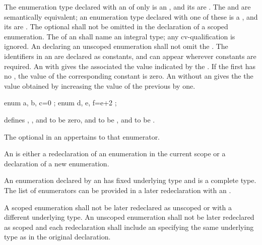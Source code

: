 \pnum
{}%
%
%
%
The enumeration type declared with an 
of only  is an ,
and its  are .
The   and
 are semantically equivalent; an enumeration
type declared with one of these is a ,
and its  are .
The optional  shall not be omitted in the declaration of a scoped enumeration.
The  of an 
shall name an integral type; any cv-qualification is ignored.
An  declaring an unscoped enumeration shall
not omit the .
The identifiers in an  are declared as
constants, and can appear wherever constants are required.
%
An  with \tcode{=} gives the associated
 the value indicated by the
.
If the first 
has no , the value of the corresponding constant
is zero. An  without an
 gives the  the value
obtained by increasing the value of the previous 
by one.
\begin{example}

\begin{codeblock}
enum { a, b, c=0 };
enum { d, e, f=e+2 };
\end{codeblock}

defines , , and  to be zero,  and
 to be , and  to be .
\end{example}
The optional  in an
 appertains to that enumerator.

\pnum
An  is either a redeclaration
of an enumeration in the current scope or a declaration of a new enumeration.
\begin{note} An enumeration declared by an
 has fixed underlying type and is a
complete type. The list of enumerators can be provided in a later redeclaration
with an . \end{note} A scoped enumeration
shall not be later redeclared as unscoped or with a different underlying type.
An unscoped enumeration shall not be later redeclared as scoped and each
redeclaration shall include an  specifying the same
underlying type as in the original declaration.

